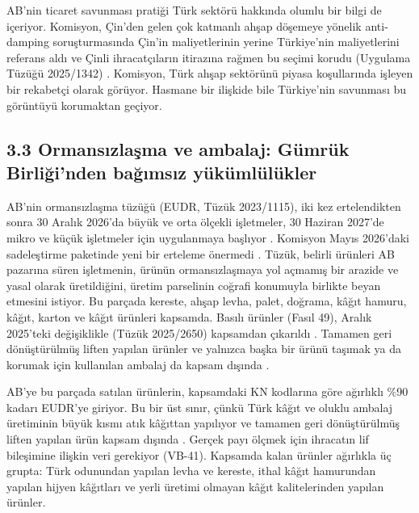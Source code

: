 AB'nin ticaret savunması pratiği Türk sektörü hakkında olumlu bir bilgi de içeriyor. Komisyon, Çin'den gelen çok katmanlı ahşap döşemeye yönelik anti-damping soruşturmasında Çin'in maliyetlerinin yerine Türkiye'nin maliyetlerini referans aldı ve Çinli ihracatçıların itirazına rağmen bu seçimi korudu (Uygulama Tüzüğü 2025/1342) \etiketV{}. Komisyon, Türk ahşap sektörünü piyasa koşullarında işleyen bir rekabetçi olarak görüyor. Hasmane bir ilişkide bile Türkiye'nin savunması bu görüntüyü korumaktan geçiyor.

\hypertarget{nace_kartlar_16-18-33-ormansux131zlaux15fma-ve-ambalaj-guxfcmruxfck-birliux11finden-baux11fux131msux131z-yuxfckuxfcmluxfcluxfckler}{%
\subsection{3.3 Ormansızlaşma ve ambalaj: Gümrük Birliği'nden bağımsız yükümlülükler}\label{nace_kartlar_16-18-33-ormansux131zlaux15fma-ve-ambalaj-guxfcmruxfck-birliux11finden-baux11fux131msux131z-yuxfckuxfcmluxfcluxfckler}}

AB'nin ormansızlaşma tüzüğü (EUDR, Tüzük 2023/1115), iki kez ertelendikten sonra 30 Aralık 2026'da büyük ve orta ölçekli işletmeler, 30 Haziran 2027'de mikro ve küçük işletmeler için uygulanmaya başlıyor \etiketV{}. Komisyon Mayıs 2026'daki sadeleştirme paketinde yeni bir erteleme önermedi \etiketV{}. Tüzük, belirli ürünleri AB pazarına süren işletmenin, ürünün ormansızlaşmaya yol açmamış bir arazide ve yasal olarak üretildiğini, üretim parselinin coğrafi konumuyla birlikte beyan etmesini istiyor. Bu parçada kereste, ahşap levha, palet, doğrama, kâğıt hamuru, kâğıt, karton ve kâğıt ürünleri kapsamda. Basılı ürünler (Fasıl 49), Aralık 2025'teki değişiklikle (Tüzük 2025/2650) kapsamdan çıkarıldı \etiketV{}. Tamamen geri dönüştürülmüş liften yapılan ürünler ve yalnızca başka bir ürünü taşımak ya da korumak için kullanılan ambalaj da kapsam dışında \etiketV{}.

AB'ye bu parçada satılan ürünlerin, kapsamdaki KN kodlarına göre ağırlıklı \%90 kadarı EUDR'ye giriyor. Bu bir üst sınır, çünkü Türk kâğıt ve oluklu ambalaj üretiminin büyük kısmı atık kâğıttan yapılıyor ve tamamen geri dönüştürülmüş liften yapılan ürün kapsam dışında \etiketH{}. Gerçek payı ölçmek için ihracatın lif bileşimine ilişkin veri gerekiyor (VB-41). Kapsamda kalan ürünler ağırlıkla üç grupta: Türk odunundan yapılan levha ve kereste, ithal kâğıt hamurundan yapılan hijyen kâğıtları ve yerli üretimi olmayan kâğıt kalitelerinden yapılan ürünler.

